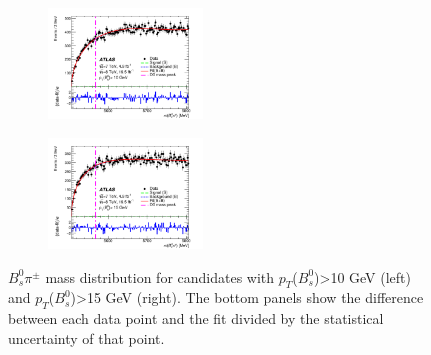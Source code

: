 \documentclass[epj]{webofc}
\begin{document}
\begin{figure}
    \centering
    \begin{subfigure}[H]{0.45\textwidth}
        \includegraphics[width=0.45\textwidth, natwidth=610,natheight=500]{plots/5568/fig_02a.png}
    \end{subfigure}
    \begin{subfigure}[H]{0.45\textwidth}
        \includegraphics[width=0.45\textwidth, natwidth=610,natheight=500]{plots/5568/fig_02b.png}
    \end{subfigure}
    \caption{$B_{s}^{0}\pi^{\pm}$ mass distribution for candidates with $p_T$($B_{s}^{0}$)>10 GeV (left) and $p_T$($B_{s}^{0}$)>15 GeV (right). 
     The bottom panels show the difference between each data point and the fit divided by the statistical uncertainty of that point.}
    \label{fig:5568}
\end{figure}
\end{document}

